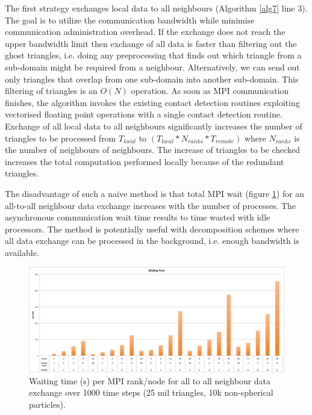 \documentclass[times,12pt]{article}
\begin{document}
The first strategy exchanges local data to all neighbours (Algorithm \ref{alg7} line 3).  The goal is to utilize the communication bandwidth while minimise communication administration
overhead. If the exchange does not reach the upper bandwidth limit then exchange of all data is faster than filtering out the ghost triangles, i.e. doing any preprocessing that finds out which triangle from a sub-domain might be required from a neighbour. Alternatively, we can send out only triangles
that overlap from one sub-domain into another sub-domain. This filtering of triangles is an $O(N)$ operation. As soon as MPI communication finishes, the algorithm invokes the existing contact
detection routines exploiting vectorised floating point operations with a single contact detection routine. Exchange of all local data to all neighbours significantly increases the number of triangles to be processed from $T_{local}$ to $(T_{local} * N_{ranks} * T_{remote})$ where $N_{ranks}$ is the number of neighbours of neighbours. The increase of triangles to be checked increases the total computation performed locally because of the redundant triangles.

The disadvantage of such a naive method is that total MPI wait (figure \ref{fig6}) for an all-to-all neighbour data exchange increases with the number of processes. The asynchronous communication wait time results to time wasted with idle processors. The method is potentially useful with decomposition schemes where all data exchange can be processed in the background, i.e. enough bandwidth is available.

\begin{figure}[!h]
\centering
\includegraphics[width=1\textwidth]{wait} \protect\caption{\label{fig6}Waiting time (s) per MPI rank/node for all to all neighbour data exchange over 1000 time steps (25 mil triangles, 10k non-spherical particles).}
\end{figure}
\end{document}
